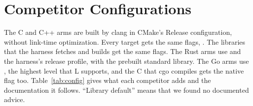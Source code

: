 \section[\appendixname~\thesection]{Competitor Configurations}\label{app:config}

The C and C++ arms are built by clang \ClangVersion{} in CMake's Release configuration, without
link-time optimization. Every target gets the same flags, \FlagsCxx. The libraries that the harness fetches
and builds get the same flags. The Rust arms use \FlagRust{} and the harness's release profile, with
the prebuilt standard library. The Go arms use \FlagGo, the highest level that L supports, and the C
that cgo compiles gets the native flag too. Table~\ref{tab:config} gives what each competitor adds and
the documentation it follows. ``Library default'' means that we found no documented advice.

